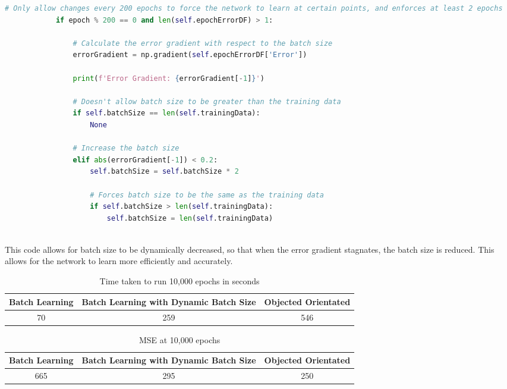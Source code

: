 \documentclass{report}
\begin{document}
\begin{lstlisting}[language=Python]
            # Only allow changes every 200 epochs to force the network to learn at certain points, and enforces at least 2 epochs
            if epoch % 200 == 0 and len(self.epochErrorDF) > 1:

                # Calculate the error gradient with respect to the batch size
                errorGradient = np.gradient(self.epochErrorDF['Error'])

                print(f'Error Gradient: {errorGradient[-1]}')

                # Doesn't allow batch size to be greater than the training data
                if self.batchSize == len(self.trainingData):
                    None

                # Increase the batch size
                elif abs(errorGradient[-1]) < 0.2:
                    self.batchSize = self.batchSize * 2

                    # Forces batch size to be the same as the training data
                    if self.batchSize > len(self.trainingData):
                        self.batchSize = len(self.trainingData)
    
\end{lstlisting}

This code allows for batch size to be dynamically decreased, so that when the error gradient stagnates, the batch size is reduced.
This allows for the network to learn more efficiently and accurately.

\begin{table}[H]
    \centering
    \begin{tabular}{|c|c|c|}
        \hline
        Batch Learning & Batch Learning with Dynamic Batch Size & Objected Orientated  \\
        \hline
        70 & 259 & 546\\
        \hline
    \end{tabular}
    \caption{Time taken to run 10,000 epochs in seconds}
    \label{tab:dynamicBatch}

\end{table}

\begin{table}[H]
    \centering
    \begin{tabular}{|c|c|c|}
        \hline
        Batch Learning & Batch Learning with Dynamic Batch Size & Objected Orientated  \\
        \hline
        665 & 295 & 250\\
        \hline
    \end{tabular}
    \caption{MSE at 10,000 epochs}
    \label{tab:dynamicBatch}

\end{table}
\end{document}
